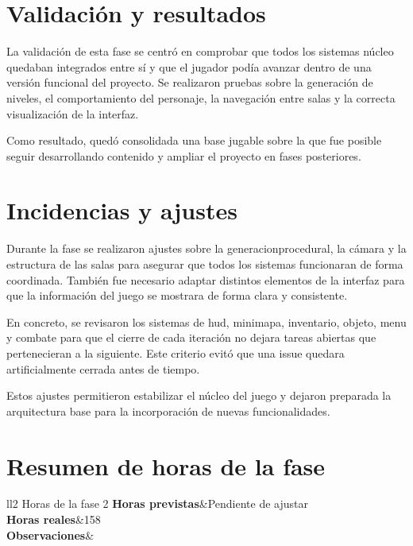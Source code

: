 \section{Validación y resultados}
La validación de esta fase se centró en comprobar que todos los sistemas núcleo quedaban integrados
entre sí y que el jugador podía avanzar dentro de una versión funcional del proyecto. Se realizaron
pruebas sobre la generación de niveles, el comportamiento del personaje, la navegación entre salas
y la correcta visualización de la interfaz.

Como resultado, quedó consolidada una base jugable sobre la que fue posible seguir desarrollando
contenido y ampliar el proyecto en fases posteriores.

\section{Incidencias y ajustes}
Durante la fase se realizaron ajustes sobre la \gls{generacionprocedural}, la cámara y la estructura de
las \glspl{sala} para asegurar que todos los sistemas funcionaran de forma coordinada. También fue necesario
adaptar distintos elementos de la interfaz para que la información del juego se mostrara de forma clara
y consistente.

En concreto, se revisaron los sistemas de \gls{hud}, \gls{minimapa}, \gls{inventario}, \gls{objeto}, \gls{menu} y \gls{combate} para que el cierre de cada iteración no dejara tareas abiertas que pertenecieran a la siguiente. Este criterio evitó que una issue quedara artificialmente cerrada antes de tiempo.

Estos ajustes permitieron estabilizar el núcleo del juego y dejaron preparada la arquitectura base
para la incorporación de nuevas funcionalidades.

\section{Resumen de horas de la fase}

\begin{table}[htb]
	\centering
	\begin{coolTable}{ll}{2}
{Horas de la fase 2}
	\textbf{Horas previstas}&Pendiente de ajustar\\
	\textbf{Horas reales}&158\\
	\textbf{Observaciones}&\\
	\end{coolTable}
	\caption{Resumen de horas de la Fase 2}
\end{table}
